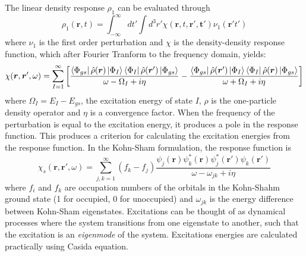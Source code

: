 The linear density response $\rho_1$ can be evaluated through\cite{Ullrich2014}
\begin{equation}\label{equation: density_response}
    \rho_{1}(\bm{r},t)=\int^{\infty}_{-\infty}dt'\int{}d^{3}r'\chi(\bm{r},t,\bm{r}',\bm{t}')\nu_{1}(\bm{r}'t')
\end{equation}
where $\nu_{1}$ is the first order perturbation and $\chi$ is the density-density response function, which after Fourier Tranform to the frequency domain, yields:\cite{Ullrich2012}
\begin{equation}
    \chi(\bm{r},\bm{r}',\omega)=\sum_{I=1}^{\infty}\bigg[\frac{\bra{\Phi_{gs}}\hat{\rho}(\bm{r})\ket{\Phi_{I}}\bra{\Phi_{I}}\hat{\rho}(\bm{r}')\ket{\Phi_{gs}}}{\omega-\Omega_{I}+i\eta{}}-\frac{\bra{\Phi_{gs}}\hat{\rho}(\bm{r}')\ket{\Phi_{I}}\bra{\Phi_{I}}\hat{\rho}(\bm{r})\ket{\Phi_{gs}}}{\omega+\Omega_{I}+i\eta{}}\bigg]
\end{equation}
where $\Omega_{I}=E_{I}-E_{gs}$, the excitation energy of state $I$, $\hat{\rho}$ is the one-particle density operator and $\eta$ is a convergence factor. When the frequency of the perturbation is equal to the excitation energy, it produces a pole in the response function. This produces a criterion for calculating the excitation energies from the response function. In the Kohn-Sham formulation, the response function is\cite{Ullrich2014}
\begin{equation}
    \chi_{s}(\bm{r},\bm{r'},\omega)=\sum_{j,k=1}^{\infty}(f_{k}-f_{j})\frac{\psi_{j}(\bm{r})\psi_{k}^{\ast}(\bm{r})\psi_{j}^{\ast}(\bm{r'})\psi_{k}(\bm{r'})}{\omega-\omega_{jk}+i\eta{}}
\end{equation}
where $f_{i}$ and $f_{k}$ are occupation numbers of the orbitals in the Kohn-Shahm ground state (1 for occupied, 0 for unoccupied) and $\omega_{jk}$ is the energy difference between Kohn-Sham eigenstates. Excitations can be thought of as dynamical processes where the system transitions from one eigenstate to another, such that the excitation is an \textit{eigenmode} of the system.\cite{Ullrich2014} Excitations energies are calculated practically using Casida equation.\cite{Casida1995}

